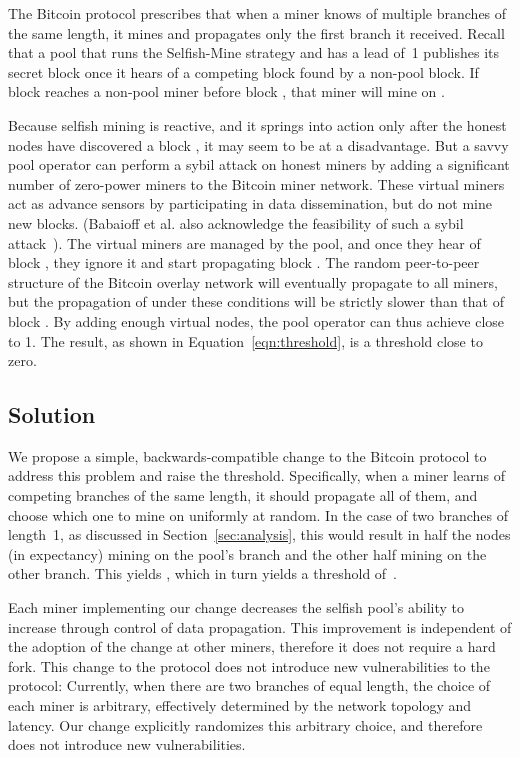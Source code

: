 \documentclass[letterpaper]{llncs}
\newcommand{\negspace}{\vspace{-0.5\baselineskip}}
\begin{document}
The Bitcoin protocol prescribes that when a miner knows of multiple branches of the same length, it mines and propagates only the first branch it received. 
Recall that a pool that runs the Selfish-Mine strategy and has a lead of~1 publishes its secret block  once it hears of a competing block  found by a non-pool block. If block  reaches a non-pool miner before block , that miner will mine on .  

Because selfish mining is reactive, and it springs into action only after the honest nodes have discovered a block , it may seem to be at a disadvantage. But a savvy pool operator can perform a sybil attack on honest miners by adding a significant number of zero-power miners to the Bitcoin miner network. These virtual miners act as advance sensors by participating in data dissemination, but do not mine new blocks. (Babaioff et al. also acknowledge the feasibility of such a sybil attack~\cite{babaioff2012baloons}). The virtual miners are managed by the pool, and once they hear of block , they ignore it and start propagating block . The random peer-to-peer structure of the Bitcoin overlay network will eventually propagate  to all miners, but the propagation of  under these conditions will be strictly slower than that of block . By adding enough virtual nodes, the pool operator can thus achieve  close to 1. The result, as shown in Equation~\ref{eqn:threshold}, is a threshold close to zero. 

        \subsection{Solution}
        \negspace

We propose a simple, backwards-compatible change to the Bitcoin protocol to address this problem and raise the threshold. 
Specifically, when a miner learns of competing branches of the same length, it should propagate all of them, and choose which one to mine on uniformly at random. 
In the case of two branches of length~1, as discussed in Section~\ref{sec:analysis}, this would result in half the nodes (in expectancy) mining on the pool's branch and the other half mining on the other branch. This yields , which in turn yields a threshold of~. 

Each miner implementing our change decreases the selfish pool's ability to increase  through control of data propagation. This improvement is independent of the adoption of the change at other miners, therefore it does not require a hard fork. 
This change to the protocol does not introduce new vulnerabilities to the protocol: 
Currently, when there are two branches of equal length, the choice of each miner is arbitrary, effectively determined by the network topology and latency. 
Our change explicitly randomizes this arbitrary choice, and therefore does not introduce new vulnerabilities. 
\end{document}
